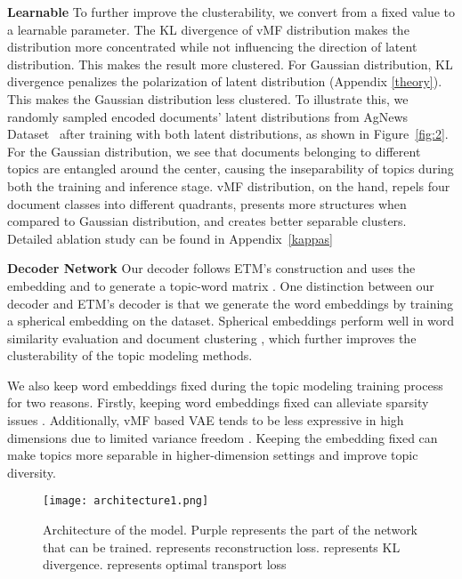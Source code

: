 \documentclass[11pt]{article}
\begin{document}
\textbf{Learnable } To further improve the clusterability, we convert  from a fixed value to a learnable parameter. The KL divergence of vMF distribution makes the distribution more concentrated while not influencing the direction of latent distribution. This makes the result more clustered. For Gaussian distribution, KL divergence penalizes the polarization of latent distribution (Appendix \ref{theory}). This makes the Gaussian distribution less clustered. 
To illustrate this, we randomly sampled encoded documents' latent distributions from AgNews Dataset~\cite{zhang2016characterlevel} after training with both latent distributions, as shown in Figure~\ref{fig:2}.
For the Gaussian distribution, we see that documents belonging to different topics are entangled around the center, causing the inseparability of topics during both the training and inference stage. vMF distribution, on the hand, repels four document classes into different quadrants, presents more structures when compared to Gaussian distribution, and creates better separable clusters. Detailed ablation study can be found in Appendix~\ref{kappas}







\textbf{Decoder Network}
Our decoder follows ETM's construction and uses the embedding  and  to generate a topic-word matrix . 
One distinction between our decoder and ETM's decoder is that we generate the word embeddings by training a spherical embedding on the dataset. Spherical embeddings perform well in word similarity evaluation and document clustering \cite{meng2019spherical}, which further improves the clusterability of the topic modeling methods. 

We also keep word embeddings fixed during the topic modeling training process for two reasons. Firstly, keeping word embeddings fixed can alleviate sparsity issues \cite{pmlr-v80-zhao18a}. Additionally, vMF based VAE tends to be less expressive in high dimensions due to limited variance freedom \cite{davidson2018hyperspherical}. Keeping the embedding fixed can make topics more separable in higher-dimension settings and improve topic diversity.

\begin{figure}
\hspace*{-0.4em}\texttt{[image: architecture1.png]}
\caption{Architecture of the model. Purple represents the part of the network that can be trained.  represents reconstruction loss.  represents KL divergence.  represents optimal transport loss}
\label{fig:people4}
\end{figure}
\end{document}
